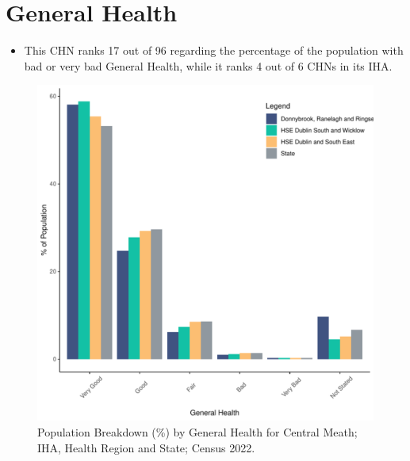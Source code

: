 \documentclass{article}
\begin{document}
\pagebreak

\section{General Health}\label{sect:GenHealth}
\begin{itemize}
\item  This CHN ranks  17 out of 96 regarding the percentage of the population with bad or very bad General Health, while it ranks   4 out of 6 CHNs in its IHA.
\end{itemize}
\begin{figure}[h]
	\centering
	\includegraphics[width = 150mm]{../figures/GenED.pdf}
	\caption{Population Breakdown (\%) by General Health for Central Meath; IHA, Health Region and State;  Census 2022.}
	\label{fig:2ae19629-1a6a-13a3-e055-000000000001}
	\end{figure}
\end{document}
